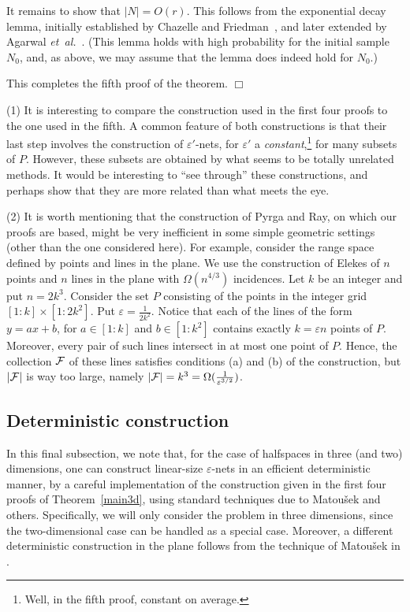 \documentclass[12pt]{article}
\newcommand{\etal}{\textit{et~al.}\xspace}
\newcommand{\eps}{{\varepsilon}}
\providecommand{\Matousek}{Matou{\v s}ek\xspace}
\def\F{{\cal F}}
\begin{document}
It remains to show that $|N|=O(r)$. This follows from the exponential
decay lemma, initially established by Chazelle and
Friedman~\cite{cf-dvrsi-90}, and later extended by Agarwal
\etal~\cite{ams-cmfal-98}.  (This lemma holds with high probability
for the initial sample $N_0$, and, as above, we may assume that the
lemma does indeed hold for $N_0$.)

This completes the fifth proof of the theorem.
$\Box$

\medskip

(1) It is interesting to compare the construction used in the first
four proofs to the one used in the fifth. A common feature of both
constructions is that their last step involves the construction of
$\eps'$-nets, for $\eps'$ a {\em constant},\footnote{Well, in the fifth proof, constant on average.}
for many subsets of $P$.
However, these subsets are obtained by what seems to be totally
unrelated methods. It would be interesting to ``see through'' these
constructions, and perhaps show that they are more related than what
meets the eye. 

\medskip

\noindent
(2) It is worth mentioning that the construction of Pyrga and Ray, on
which our proofs are based, might be very inefficient in some simple
geometric settings (other than the one considered here). For example,
consider the range space defined by points and lines in the plane.  We
use the construction of Elekes \cite{e-spnta-02} of $n$ points and $n$
lines in the plane with $\Omega(n^{4/3})$ incidences.  Let $k$ be an
integer and put $n=2k^3$. Consider the set $P$ consisting of the
points in the integer grid $[1:k]\times [1:2k^2]$.  Put $\eps =
\frac{1}{2k^2}$. Notice that each of the lines of the form $y = ax+b$,
for $a \in [1:k]$ and $b \in [1:k^2]$ contains exactly $k = \eps n$
points of $P$. Moreover, every pair of such lines intersect in at most
one point of $P$. Hence, the collection $\F$ of these lines satisfies
conditions (a) and (b) of the construction, but $|\F|$ is way too
large, namely $|\F| = k^3= \Omega(\frac{1}{\eps^{3/2}})$.




\subsection{Deterministic construction}

In this final subsection, we note that, for the case of halfspaces in
three (and two) dimensions, one can construct linear-size $\eps$-nets
in an efficient deterministic manner, by a careful implementation of
the construction given in the first four proofs of
Theorem~\ref{main3d}, using standard techniques due to \Matousek and
others. Specifically, we will only consider the problem in three
dimensions, since the two-dimensional case can be handled as a special
case. Moreover, a different deterministic construction in the plane
follows from the technique of \Matousek in \cite{m-cen-90}.
\end{document}
